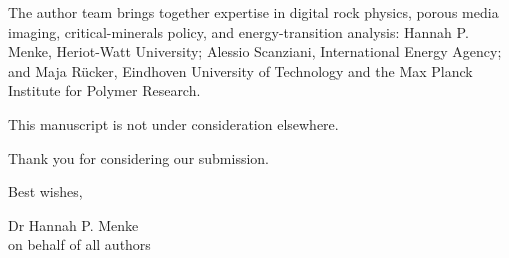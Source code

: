\documentclass[11pt,a4paper]{article}
\begin{document}
The author team brings together expertise in digital rock physics, porous media imaging, critical-minerals policy, and energy-transition analysis: Hannah P. Menke, Heriot-Watt University; Alessio Scanziani, International Energy Agency; and Maja R\"ucker, Eindhoven University of Technology and the Max Planck Institute for Polymer Research.

This manuscript is not under consideration elsewhere.

Thank you for considering our submission.

Best wishes,

\vspace{2.7em}

Dr Hannah P. Menke\\
on behalf of all authors
\end{document}
